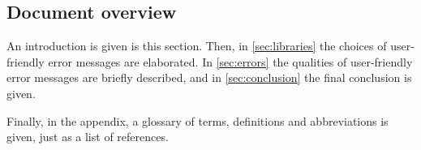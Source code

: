 \subsection{Document overview}
An introduction is given is this section.
Then, in \autoref{sec:libraries} the choices of user-friendly error messages are elaborated.
In \autoref{sec:errors} the qualities of user-friendly error messages are briefly described, and in \autoref{sec:conclusion} the final conclusion is given.

Finally, in the appendix, a glossary of terms, definitions and abbreviations is given, just as a list of references.
